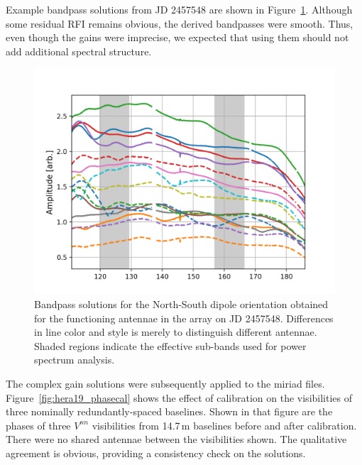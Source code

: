Example bandpass solutions from JD 2457548 are shown in Figure~\ref{fig:hera19_bandpass}. Although some residual RFI remains obvious, the derived bandpasses were smooth.  Thus, even though the gains were imprecise, we expected that using them should not add additional spectral structure.  %

\begin{figure}
\centering
\includegraphics[scale=0.5]{chapters/eor_window_HERA/figures/h19_2457458_abs_smallzoom_nolegend.png}
\caption[Bandpass solutions for the North-South dipole orientation obtained for the functioning antennae in the array on JD 2457548.]{Bandpass solutions for the North-South dipole orientation obtained for the functioning antennae in the array on JD 2457548. Differences in line color and style is merely to distinguish different antennae. Shaded regions indicate the effective sub-bands used for power spectrum analysis.}
\label{fig:hera19_bandpass}
\end{figure}

The complex gain solutions were subsequently applied to the {\sc miriad} files. Figure~\ref{fig:hera19_phasecal} shows the effect of calibration on the visibilities of three nominally redundantly-spaced baselines. Shown in that figure are the phases of three $V^{nn}$ visibilities from 14.7\,m baselines before and after calibration. There were no shared antennae between the visibilities shown. The qualitative agreement is obvious, providing a consistency check on the solutions.

